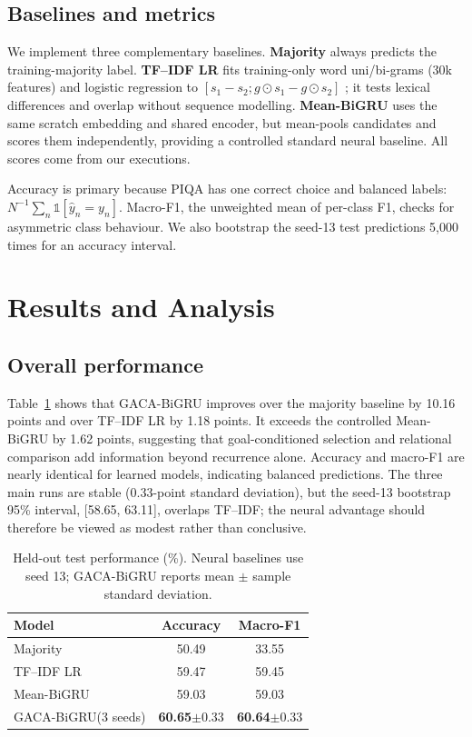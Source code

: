 \documentclass[11pt]{article}
\newcommand{\model}{GACA-BiGRU\xspace}
\begin{document}
\subsection{Baselines and metrics}
We implement three complementary baselines. \textbf{Majority} always predicts the training-majority label. \textbf{TF--IDF LR} fits training-only word uni/bi-grams (30k features) and logistic regression to $[s_1-s_2;g\odot s_1-g\odot s_2]$ \citep{salton1988tfidf}; it tests lexical differences and overlap without sequence modelling. \textbf{Mean-BiGRU} uses the same scratch embedding and shared encoder, but mean-pools candidates and scores them independently, providing a controlled standard neural baseline. All scores come from our executions.

Accuracy is primary because PIQA has one correct choice and balanced labels: $N^{-1}\sum_n\mathbb{1}[\hat y_n=y_n]$. Macro-F1, the unweighted mean of per-class F1, checks for asymmetric class behaviour. We also bootstrap the seed-13 test predictions 5,000 times for an accuracy interval.

\section{Results and Analysis}
\subsection{Overall performance}
Table~\ref{tab:overall} shows that \model improves over the majority baseline by 10.16 points and over TF--IDF LR by 1.18 points. It exceeds the controlled Mean-BiGRU by 1.62 points, suggesting that goal-conditioned selection and relational comparison add information beyond recurrence alone. Accuracy and macro-F1 are nearly identical for learned models, indicating balanced predictions. The three main runs are stable (0.33-point standard deviation), but the seed-13 bootstrap 95\% interval, [58.65, 63.11], overlaps TF--IDF; the neural advantage should therefore be viewed as modest rather than conclusive.

\begin{table}[t]
\centering
\small
\begin{tabular}{lcc}
\toprule
Model & Accuracy & Macro-F1 \\
\midrule
Majority & 50.49 & 33.55 \\
TF--IDF LR & 59.47 & 59.45 \\
Mean-BiGRU & 59.03 & 59.03 \\
\model (3 seeds) & \textbf{60.65}$\pm$0.33 & \textbf{60.64}$\pm$0.33 \\
\bottomrule
\end{tabular}
\caption{Held-out test performance (\%). Neural baselines use seed 13; \model reports mean $\pm$ sample standard deviation.}
\label{tab:overall}
\end{table}
\end{document}
